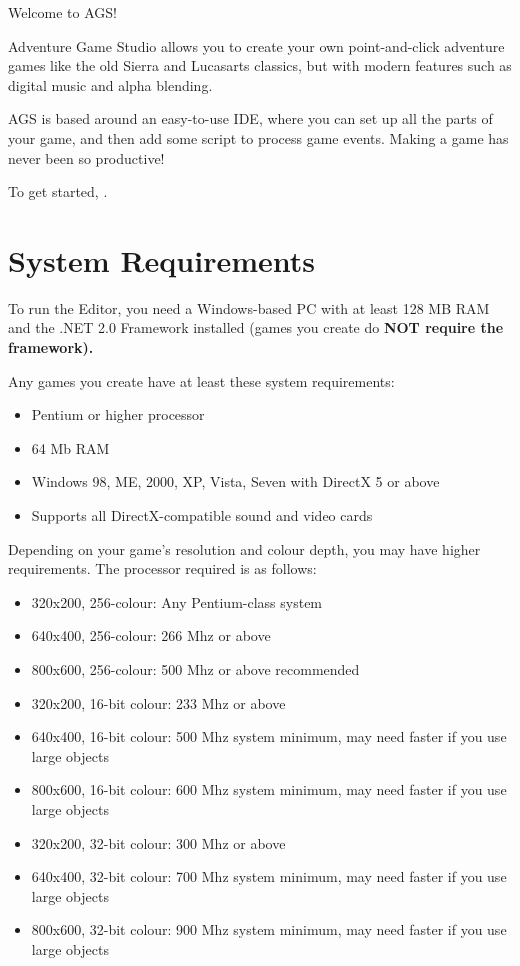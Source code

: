Welcome to AGS!

Adventure Game Studio allows you to create your own point-and-click adventure
games like the old Sierra and Lucasarts classics, but with modern features
such as digital music and alpha blending.

AGS is based around an easy-to-use IDE, where you can set up all the parts of
your game, and then add some script to process game events. Making a game
has never been so productive!

To get started, .

\section{System Requirements}%

To run the Editor, you need a Windows-based PC with at least 128 MB RAM and
the .NET 2.0 Framework installed (games you create do \bf{NOT} require the framework).

Any games you create have at least these system requirements:

\begin{itemize}\itemsep=0pt
\item Pentium or higher processor
\item 64 Mb RAM
\item Windows 98, ME, 2000, XP, Vista, Seven with DirectX 5 or above
\item Supports all DirectX-compatible sound and video cards
\end{itemize}

Depending on your game's resolution and colour depth, you may have higher requirements.
The processor required is as follows:

\begin{itemize}\itemsep=0pt
\item 320x200, 256-colour:  Any Pentium-class system
\item 640x400, 256-colour:  266 Mhz or above
\item 800x600, 256-colour:  500 Mhz or above recommended
\item 320x200, 16-bit colour:  233 Mhz or above
\item 640x400, 16-bit colour:  500 Mhz system minimum, may need faster if you use large objects
\item 800x600, 16-bit colour:  600 Mhz system minimum, may need faster if you use large objects
\item 320x200, 32-bit colour:  300 Mhz or above
\item 640x400, 32-bit colour:  700 Mhz system minimum, may need faster if you use large objects
\item 800x600, 32-bit colour:  900 Mhz system minimum, may need faster if you use large objects
\end{itemize}

